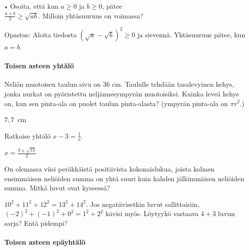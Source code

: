 \begin{tehtavasivu}
\begin{tehtava} 
$\star$ Osoita, että kun $a \geq 0$ ja $b \geq 0$, pätee \\ $\frac{a+b}{2} \geq \sqrt{ab}$. Milloin yhtäsuuruus on voimassa?
    \begin{vastaus}
     Opastus: Aloita tiedosta $\left(\sqrt{a}-\sqrt{b}\right)^2 \geq 0$ ja sievennä. Yhtäsuuruus pätee, kun $a = b$.
    \end{vastaus}
\end{tehtava}

\paragraph*{Toisen asteen yhtälö}

\begin{tehtava} %
Neliön muotoisen taulun sivu on 36 cm. Taululle tehdään tasalevyinen kehys, jonka
nurkat on pyöristettu neljännesympyrän muotoisiksi. Kuinka leveä kehys on, kun sen
pinta-ala on puolet taulun pinta-alasta? (ympyrän pinta-ala on $\pi r^2$.)
    \begin{vastaus}
     $7,7$~cm
    \end{vastaus}
\end{tehtava}

\begin{tehtava} %
Ratkaise yhtälö $x - 3 = \frac{1}{x}$.
    \begin{vastaus}
    $x =\frac{3 \pm \sqrt{13}}{2}$
    \end{vastaus}
\end{tehtava}

\begin{tehtava} %
On olemassa viisi peräkkäistä positiivista kokonaislukua, joista kolmen
ensimmäisen neliöiden summa on yhtä suuri kuin kahden jälkimmäisen
neliöiden summa. Mitkä luvut ovat kyseessä?
    \begin{vastaus}
		$10^2+11^2+12^2 = 13^2 + 14^2$.
    	Jos negatiivisetkin luvut sallittaisiin, $(-2)^2+(-1)^2+0^2 = 1^2 + 2^2$ kävisi 			myös. Löytyykö vastaava $4 + 3$ luvun sarja? Entä pidempi?
    \end{vastaus}
\end{tehtava}

\paragraph*{Toisen asteen epäyhtälö}


\end{tehtavasivu}
